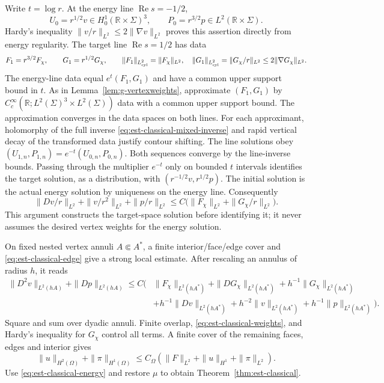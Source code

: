 \documentclass[11pt,a4paper]{article}
\theoremstyle{remark}
\numberwithin{equation}{section}
\begin{document}
Write $t=\log r$. At the energy line $\operatorname{Re}s=-1/2$,
\[
 U_0=r^{1/2}v\in H_0^1(\mathbb R\times\Sigma)^3,
 \qquad P_0=r^{3/2}p\in L^2(\mathbb R\times\Sigma).
\]
Hardy's inequality $\|v/r\|_{L^2}\le2\|\nabla v\|_{L^2}$ proves
this assertion directly from energy regularity. The target line
$\operatorname{Re}s=1/2$ has data
\[
 F_1=r^{3/2}F_\chi,
 \qquad G_1=r^{1/2}G_\chi,
 \qquad
 \|F_1\|_{L^2_{\rm cyl}}=\|F_\chi\|_{L^2},\quad
 \|G_1\|_{L^2_{\rm cyl}}=\|G_\chi/r\|_{L^2}
 \le2\|\nabla G_\chi\|_{L^2}.
\]
The energy-line data equal $e^t(F_1,G_1)$ and have a common upper
support bound in $t$. As in Lemma~\ref{lem:g-vertexweights}, approximate
$(F_1,G_1)$ by
$C_c^\infty(\mathbb R;L^2(\Sigma)^3\times L^2(\Sigma))$ data
with a common upper support bound. The approximation converges in the
data spaces on both lines. For each approximant,
holomorphy of the full inverse
\eqref{eq:est-classical-mixed-inverse} and rapid vertical decay of the
transformed data justify contour shifting. The line solutions obey
$(U_{1,n},P_{1,n})=e^{-t}(U_{0,n},P_{0,n})$.
Both sequences converge by the line-inverse bounds. Passing through the
multiplier $e^{-t}$ only on bounded $t$ intervals identifies the target
solution, as a distribution, with
$(r^{-1/2}v,r^{1/2}p)$. The initial solution is the actual energy solution
by uniqueness on the energy line. Consequently
\begin{equation}\label{eq:est-classical-weights}
 \|Dv/r\|_{L^2}+\|v/r^2\|_{L^2}+\|p/r\|_{L^2}
 \le C\bigl(\|F_\chi\|_{L^2}+\|G_\chi/r\|_{L^2}\bigr).
\end{equation}
This argument constructs the target-space solution before identifying it;
it never assumes the desired vertex weights for the energy solution.

On fixed nested vertex annuli $A\Subset A^*$, a finite interior/face/edge
cover and \eqref{eq:est-classical-edge} give a strong local estimate.
After rescaling an annulus of radius $h$, it reads
\begin{align*}
 \|D^2v\|_{L^2(hA)}+\|Dp\|_{L^2(hA)}
 \le C\bigl(&\|F_\chi\|_{L^2(hA^*)}+\|DG_\chi\|_{L^2(hA^*)}
       +h^{-1}\|G_\chi\|_{L^2(hA^*)}\\
 &+h^{-1}\|Dv\|_{L^2(hA^*)}+h^{-2}\|v\|_{L^2(hA^*)}
       +h^{-1}\|p\|_{L^2(hA^*)}\bigr).
\end{align*}
Square and sum over dyadic annuli. Finite overlap,
\eqref{eq:est-classical-weights}, and Hardy's inequality for $G_\chi$
control all terms. A finite cover of the remaining faces, edges and
interior gives
\[
 \|u\|_{H^2(\Omega)}+\|\pi\|_{H^1(\Omega)}
 \le C_\Omega(\|F\|_{L^2}+\|u\|_{H^1}+\|\pi\|_{L^2}).
\]
Use \eqref{eq:est-classical-energy} and restore $\mu$ to obtain
Theorem~\ref{thm:est-classical}.
\end{document}
